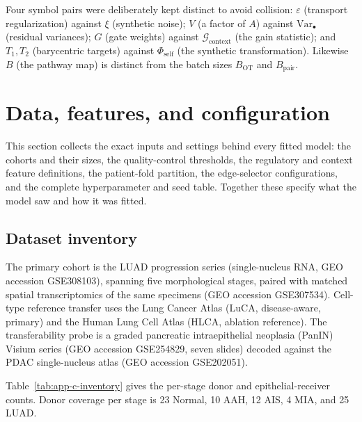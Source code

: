 Four symbol pairs were deliberately kept distinct to avoid collision:
$\varepsilon$ (transport regularization) against $\xi$ (synthetic noise);
$V$ (a factor of $A$) against $\mathrm{Var}_{\bullet}$ (residual variances);
$G$ (gate weights) against $\mathcal{G}_{\mathrm{context}}$ (the gain
statistic); and $T_{1},T_{2}$ (barycentric targets) against
$\Phi_{\mathrm{self}}$ (the synthetic transformation). Likewise $B$ (the
pathway map) is distinct from the batch sizes $B_{\mathrm{OT}}$ and
$B_{\mathrm{pair}}$.

\section{Data, features, and configuration}\label{sec:app-c-config}

This section collects the exact inputs and settings behind every fitted model:
the cohorts and their sizes, the quality-control thresholds, the regulatory and
context feature definitions, the patient-fold partition, the edge-selector
configurations, and the complete hyperparameter and seed table. Together these
specify what the model saw and how it was fitted.

\subsection{Dataset inventory}\label{sec:app-c-inventory}

The primary cohort is the LUAD progression series (single-nucleus RNA, GEO accession GSE308103),
spanning five morphological stages, paired with matched spatial transcriptomics of the same
specimens (GEO accession GSE307534). Cell-type reference transfer uses the Lung Cancer Atlas (LuCA, disease-aware, primary)
and the Human Lung Cell Atlas (HLCA, ablation reference). The transferability probe is a graded
pancreatic intraepithelial neoplasia (PanIN) Visium series (GEO accession GSE254829, seven slides)
decoded against the PDAC single-nucleus atlas (GEO accession GSE202051).


Table~\ref{tab:app-c-inventory} gives the per-stage donor and epithelial-receiver counts. Donor
coverage per stage is 23 Normal, 10 AAH, 12 AIS, 4 MIA, and 25 LUAD.

